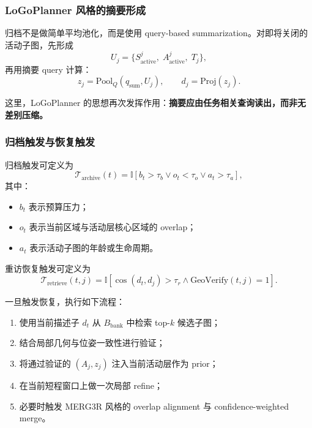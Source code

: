 \documentclass[12pt]{article}
\begin{document}
\subsubsection{LoGoPlanner 风格的摘要形成}

归档不是做简单平均池化，而是使用 query-based summarization。对即将关闭的活动子图，先形成
\begin{equation}
U_j = \{S_{\text{active}}^j,\; A_{\text{active}}^j,\; T_j\},
\end{equation}
再用摘要 query 计算：
\begin{equation}
z_j = \mathrm{Pool}_Q(q_{\text{sum}}, U_j), \qquad d_j = \mathrm{Proj}(z_j).
\end{equation}

这里，LoGoPlanner 的思想再次发挥作用：\textbf{摘要应由任务相关查询读出，而非无差别压缩。}

\subsubsection{归档触发与恢复触发}

归档触发可定义为
\begin{equation}
\mathcal{T}_{\text{archive}}(t)=\mathbb{I}[b_t>\tau_b \lor o_t<\tau_o \lor a_t>\tau_a],
\end{equation}
其中：
\begin{itemize}
  \item $b_t$ 表示预算压力；
  \item $o_t$ 表示当前区域与活动层核心区域的 overlap；
  \item $a_t$ 表示活动子图的年龄或生命周期。
\end{itemize}

重访恢复触发可定义为
\begin{equation}
\mathcal{T}_{\text{retrieve}}(t,j)=\mathbb{I}\left[\cos(d_t,d_j)>\tau_r \land \mathrm{GeoVerify}(t,j)=1\right].
\end{equation}

一旦触发恢复，执行如下流程：
\begin{enumerate}
  \item 使用当前描述子 $d_t$ 从 $B_{\text{bank}}$ 中检索 top-$k$ 候选子图；
  \item 结合局部几何与位姿一致性进行验证；
  \item 将通过验证的 $(A_j, z_j)$ 注入当前活动层作为 prior；
  \item 在当前短程窗口上做一次局部 refine；
  \item 必要时触发 MERG3R 风格的 overlap alignment 与 confidence-weighted merge。
\end{enumerate}
\end{document}
